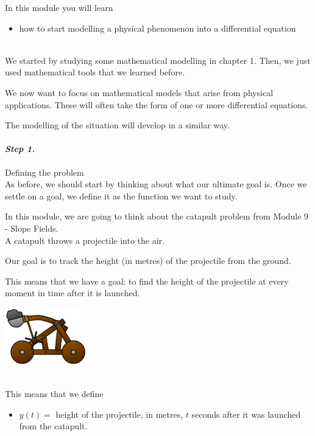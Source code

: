 In this module you will learn
\begin{itemize}
	\item how to start modelling a physical phenomenon into a differential equation
\end{itemize}

\hfill \\


We started by studying some mathematical modelling in chapter 1. Then, we just used mathematical tools that we learned before. 

We now want to focus on mathematical models that arise from physical applications. These will often take the form of one or more differential equations.

The modelling of the situation will develop in a similar way.


\paragraph{\emph{Step 1.}} Defining the problem \\

As before, we should start by thinking about what our ultimate goal is. 
Once we settle on a goal, we define it as the function we want to study.

\begin{example}

\begin{minipage}{.7\textwidth}
In this module, we are going to think about the catapult problem from Module 9 - Slope Fields. \\

A catapult throws a projectile into the air.

Our goal is to track the height (in metres) of the projectile from the ground.

This means that we have a goal: to find the height of the projectile at every moment in time after it is launched.
\end{minipage}\hfill
\begin{minipage}{100pt}
	\includegraphics*[width=100pt]{images/module9-catapult.pdf}	
\end{minipage}
\hfill \\[10pt]

This means that we define
\begin{itemize}
	\item $y(t) = $ height of the projectile, in metres, $t$ seconds after it was launched from the catapult.
\end{itemize}

\end{example}

